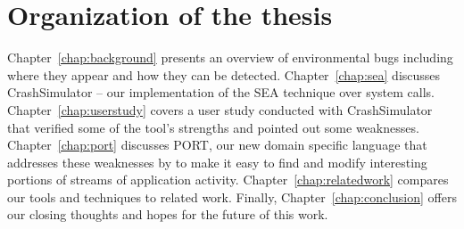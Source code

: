 \section{Organization of the thesis}
\label{sec:organization}
Chapter~\ref{chap:background}
presents an overview of environmental bugs including where they
appear and how they can be detected.
Chapter~\ref{chap:sea}
discusses CrashSimulator -- our implementation of the SEA
technique over system calls.
Chapter~\ref{chap:userstudy}
covers a user study conducted with CrashSimulator that
verified some of the tool's strengths and pointed out some weaknesses.
Chapter~\ref{chap:port}
discusses PORT,
our new domain specific language that addresses these weaknesses by to make
it easy to find and modify interesting portions of streams of
application activity.
Chapter~\ref{chap:relatedwork}
compares our tools and techniques to related work.
Finally,
Chapter~\ref{chap:conclusion} offers our closing thoughts and hopes for
the future of this work.

